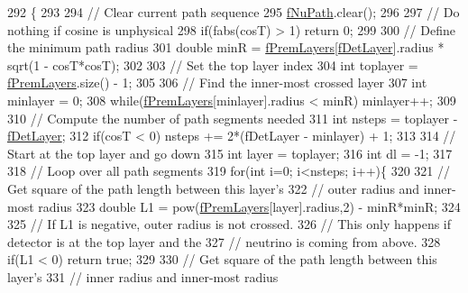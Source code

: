 \begin{DoxyCode}
292 \{
293 
294   \textcolor{comment}{// Clear current path sequence}
295   \hyperlink{classOscProb_1_1PremModel_aaf3c77e35798d664853157013c90ad2b}{fNuPath}.clear();
296   
297   \textcolor{comment}{// Do nothing if cosine is unphysical}
298   \textcolor{keywordflow}{if}(fabs(cosT) > 1) \textcolor{keywordflow}{return} 0;
299 
300   \textcolor{comment}{// Define the minimum path radius}
301   \textcolor{keywordtype}{double} minR = \hyperlink{classOscProb_1_1PremModel_a19a9a3b23ec154ad7a29f92b74aa5bc6}{fPremLayers}[\hyperlink{classOscProb_1_1PremModel_a4fb68506493666349f418b893a996185}{fDetLayer}].radius * sqrt(1 - cosT*cosT);
302 
303   \textcolor{comment}{// Set the top layer index}
304   \textcolor{keywordtype}{int} toplayer = \hyperlink{classOscProb_1_1PremModel_a19a9a3b23ec154ad7a29f92b74aa5bc6}{fPremLayers}.size() - 1;
305   
306   \textcolor{comment}{// Find the inner-most crossed layer}
307   \textcolor{keywordtype}{int} minlayer = 0;
308   \textcolor{keywordflow}{while}(\hyperlink{classOscProb_1_1PremModel_a19a9a3b23ec154ad7a29f92b74aa5bc6}{fPremLayers}[minlayer].radius < minR) minlayer++; 
309 
310   \textcolor{comment}{// Compute the number of path segments needed}
311   \textcolor{keywordtype}{int} nsteps = toplayer - \hyperlink{classOscProb_1_1PremModel_a4fb68506493666349f418b893a996185}{fDetLayer};
312   \textcolor{keywordflow}{if}(cosT < 0) nsteps += 2*(fDetLayer - minlayer) + 1;
313 
314   \textcolor{comment}{// Start at the top layer and go down}
315   \textcolor{keywordtype}{int} layer = toplayer;
316   \textcolor{keywordtype}{int} dl = -1;
317   
318   \textcolor{comment}{// Loop over all path segments}
319   \textcolor{keywordflow}{for}(\textcolor{keywordtype}{int} i=0; i<nsteps; i++)\{
320   
321     \textcolor{comment}{// Get square of the path length between this layer's }
322     \textcolor{comment}{// outer radius and  inner-most radius}
323     \textcolor{keywordtype}{double} L1 = pow(\hyperlink{classOscProb_1_1PremModel_a19a9a3b23ec154ad7a29f92b74aa5bc6}{fPremLayers}[layer].radius,2) - minR*minR;
324 
325     \textcolor{comment}{// If L1 is negative, outer radius is not crossed.}
326     \textcolor{comment}{// This only happens if detector is at the top layer and the}
327     \textcolor{comment}{// neutrino is coming from above.}
328     \textcolor{keywordflow}{if}(L1 < 0) \textcolor{keywordflow}{return} \textcolor{keyword}{true};
329     
330     \textcolor{comment}{// Get square of the path length between this layer's }
331     \textcolor{comment}{// inner radius and  inner-most radius}

\end{DoxyCode}
